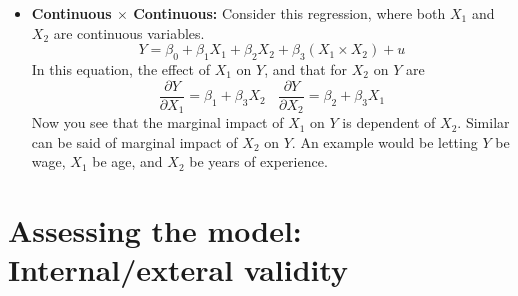 \begin{itemize}
\item \textbf{Continuous $\times$ Continuous: } Consider this regression, where both $X_1$ and $X_2$ are continuous variables. 
\[
Y = \beta_0 + \beta_1X_1 + \beta_2 X_2 + \beta_3 (X_1\times X_2)+u
\] 
In this equation, the effect of $X_1$ on $Y$, and that for $X_2$ on $Y$ are
\[
\frac{\partial Y}{\partial X_1} = \beta_1 + \beta_3 X_2 \ \ \ \ \frac{\partial Y}{\partial X_2} = \beta_2 + \beta_3 X_1 
\]
Now you see that the marginal impact of $X_1$ on $Y$ is dependent of $X_2$. Similar can be said of marginal impact of $X_2$ on $Y$. An example would be letting $Y$ be wage, $X_1$ be age, and $X_2$ be years of experience. \par\medskip
\end{itemize}
\chapter{Assessing the model: Internal/exteral validity}
